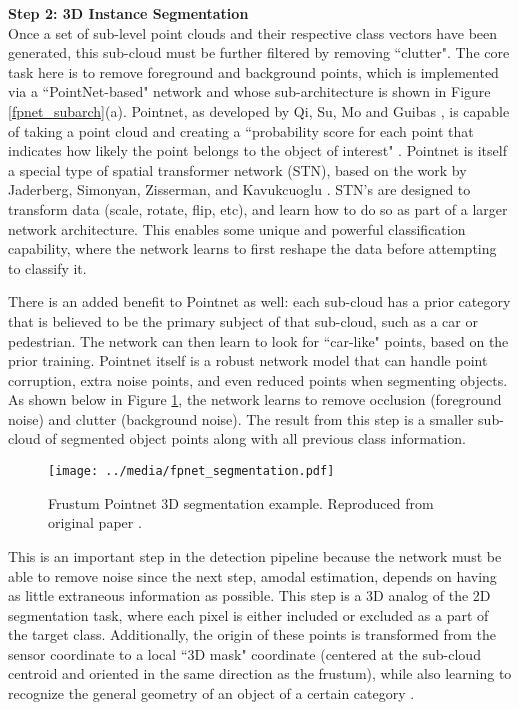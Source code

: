\textbf{{\large Step 2: 3D Instance Segmentation}} \\
Once a set of sub-level point clouds and their respective class vectors have been generated, this sub-cloud must be further filtered by removing ``clutter". The core task here is to remove foreground and background points, which is implemented via a ``PointNet-based" network and whose sub-architecture is shown in Figure \ref{fpnet_subarch}(a). Pointnet, as developed by Qi, Su, Mo and Guibas \cite{qi_pointnet:_2017}, is capable of taking a point cloud and creating a ``probability score for each point that indicates how likely the point belongs to the object of interest" \cite{qi_frustum_2017}. Pointnet is itself a special type of spatial transformer network (STN), based on the work by Jaderberg, Simonyan, Zisserman, and Kavukcuoglu \cite{jaderberg_spatial_2015}. STN's are designed to transform data (scale, rotate, flip, etc), and learn how to do so as part of a larger network architecture. This enables some unique and powerful classification capability, where the network learns to first reshape the data before attempting to classify it. 

There is an added benefit to Pointnet as well: each sub-cloud has a prior category that is believed to be the primary subject of that sub-cloud, such as a car or pedestrian. The network can then learn to look for ``car-like" points, based on the prior training. Pointnet itself is a robust network model that can handle point corruption, extra noise points, and even reduced points when segmenting objects. As shown below in Figure \ref{fpnet_segmentation}, the network learns to remove occlusion (foreground noise) and clutter (background noise). The result from this step is a smaller sub-cloud of segmented object points along with all previous class information. 

\begin{figure}[H]
    \centering
    \texttt{[image: ../media/fpnet\_segmentation.pdf]}
    \caption{Frustum Pointnet 3D segmentation example. Reproduced from original paper \cite{qi_frustum_2017}.}
    \label{fpnet_segmentation}
\end{figure}

This is an important step in the detection pipeline because the network must be able to remove noise since the next step, amodal estimation, depends on having as little extraneous information as possible. This step is a 3D analog of the 2D segmentation task, where each pixel is either included or excluded as a part of the target class. Additionally, the origin of these points is transformed from the sensor coordinate to a local ``3D mask" coordinate (centered at the sub-cloud centroid and oriented in the same direction as the frustum), while also learning to recognize the general geometry of an object of a certain category \cite{qi_frustum_2017}.

